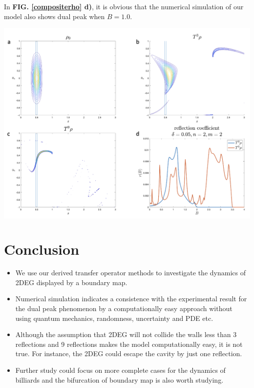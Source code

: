 \documentclass[a0,portrait]{a0poster}
\begin{document}
\begin{multicols}{3}
In \textbf{FIG. \ref{compositerho} d)}, it is obvious that the numerical simulation of our model also shows dual peak when $B=1.0$.
\begin{center}\vspace{1cm}
\includegraphics[width=0.85\linewidth]{compositerho.png}
\label{compositerho}
\end{center}%


\section*{Conclusion}
\begin{itemize}
    \item We use our derived transfer operator methods to investigate the dynamics of 2DEG displayed by a boundary map.
    \item Numerical simulation indicates a consistence with the experimental result for the dual peak phenomenon by a computationally easy approach without using quantum mechanics, randomness, uncertainty and PDE etc.
    \item Although the assumption that 2DEG will not collide the walls less than 3 reflections and 9 reflections makes the model computationally easy, it is not true. For instance, the 2DEG could escape the cavity by just one reflection.
    \item Further study could focus on more complete cases for the dynamics of billiards and the bifurcation of boundary map is also worth studying.
\end{itemize}


\end{multicols}
\end{document}
